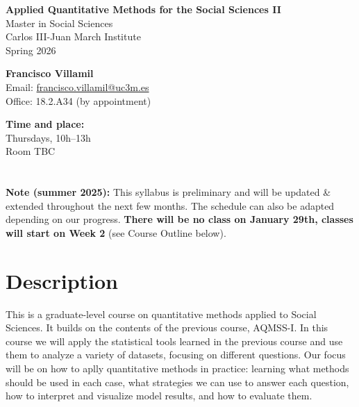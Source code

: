 \documentclass[12pt, a4paper]{article}
\begin{document}
\begin{center}
{\Large\bf Applied Quantitative Methods for the Social Sciences II}\\\vspace{10pt}
Master in Social Sciences\\Carlos III-Juan March Institute\\
\vspace{10pt}
{\large Spring 2026}\\
\end{center}

\vspace{15pt}

\begin{minipage}{0.6\textwidth}
\textbf{Francisco Villamil}\\
Email: \href{francisco.villamil@uc3m.es}{francisco.villamil@uc3m.es}\\
Office: 18.2.A34 (by appointment)
\end{minipage}\hfill
\begin{minipage}{0.39\textwidth}
\centering
\textbf{Time and place:}\\
Thursdays, 10h--13h\\Room TBC
\end{minipage}


\section*{}

\textbf{Note (summer 2025):} This syllabus is preliminary and will be updated \& extended throughout the next few months. The schedule can also be adapted depending on our progress. \textbf{There will be no class on January 29th, classes will start on Week 2} (see Course Outline below).

\section{Description}

This is a graduate-level course on quantitative methods applied to Social Sciences. It builds on the contents of the previous course, AQMSS-I. In this course we will apply the statistical tools learned in the previous course and use them to analyze a variety of datasets, focusing on different questions. Our focus will be on how to aplly quantitative methods in practice: learning what methods should be used in each case, what strategies we can use to answer each question, how to interpret and visualize model results, and how to evaluate them.
\end{document}
